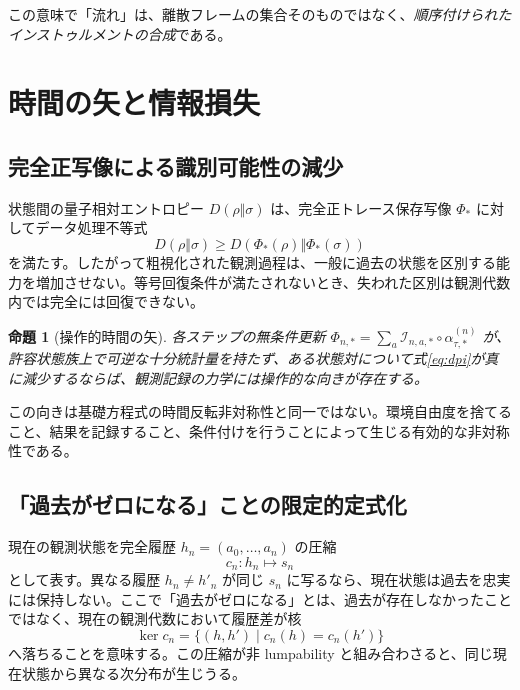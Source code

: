 \documentclass[a4paper,11pt]{ltjsarticle}
\newtheorem{proposition}[definition]{命題}
\theoremstyle{remark}
\begin{document}
この意味で「流れ」は、離散フレームの集合そのものではなく、\emph{順序付けられたインストゥルメントの合成}である。

\section{時間の矢と情報損失}

\subsection{完全正写像による識別可能性の減少}
状態間の量子相対エントロピー $D(\rho\Vert\sigma)$ は、完全正トレース保存写像 $\Phi_*$ に対してデータ処理不等式
\begin{equation}
 D(\rho\Vert\sigma)
 \geq D(\Phi_*(\rho)\Vert\Phi_*(\sigma))
 \label{eq:dpi}
\end{equation}
を満たす。したがって粗視化された観測過程は、一般に過去の状態を区別する能力を増加させない。等号回復条件が満たされないとき、失われた区別は観測代数内では完全には回復できない。

\begin{proposition}[操作的時間の矢]
各ステップの無条件更新 $\Phi_{n,*}=\sum_a\mathcal I_{n,a,*}\circ\alpha_{\tau,*}^{(n)}$ が、許容状態族上で可逆な十分統計量を持たず、ある状態対について式\eqref{eq:dpi}が真に減少するならば、観測記録の力学には操作的な向きが存在する。
\end{proposition}

この向きは基礎方程式の時間反転非対称性と同一ではない。環境自由度を捨てること、結果を記録すること、条件付けを行うことによって生じる有効的な非対称性である。

\subsection{「過去がゼロになる」ことの限定的定式化}
現在の観測状態を完全履歴 $h_n=(a_0,\ldots,a_n)$ の圧縮
\begin{equation}
 c_n:h_n\longmapsto s_n
\end{equation}
として表す。異なる履歴 $h_n\neq h'_n$ が同じ $s_n$ に写るなら、現在状態は過去を忠実には保持しない。ここで「過去がゼロになる」とは、過去が存在しなかったことではなく、現在の観測代数において履歴差が核
\begin{equation}
 \ker c_n=\{(h,h')\mid c_n(h)=c_n(h')\}
\end{equation}
へ落ちることを意味する。この圧縮が非 lumpability と組み合わさると、同じ現在状態から異なる次分布が生じうる。
\end{document}
